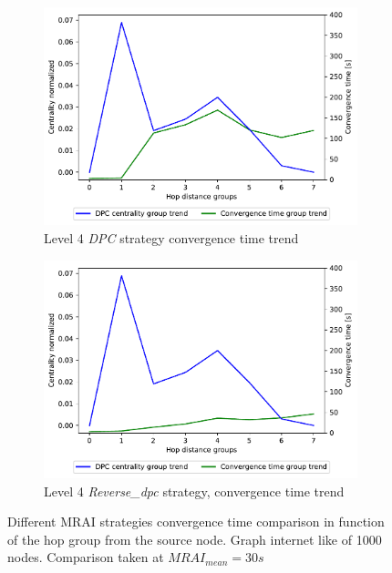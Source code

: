 \documentclass[10pt,conference,letterpaper]{IEEEtran}
\newcommand{\figwidth}{0.78}
\newcommand{\figvspace}{-1.5em}
\begin{document}
\begin{figure}[tb]
	\begin{subfigure}{.49\columnwidth}
		\centering
		\includegraphics[width=\figwidth\columnwidth]{images/different_levels/1000-DPC-l11_node-conv_MRAI30_centVStime_trend.pdf}
		\caption{Level 4 \textit{DPC} strategy convergence time trend}
		\label{fig:1000-dpc-time-trend-level4}
	\end{subfigure}
	\hfill
	\begin{subfigure}{.49\columnwidth}
		\centering
		\includegraphics[width=\figwidth\columnwidth]{images/different_levels/1000-reverse_dpc-l11_node-conv_MRAI30_centVStime_trend.pdf}
		\caption{Level 4 \textit{Reverse\_dpc} strategy, convergence time trend}
		\label{fig:1000-reverse-dpc-time-trend-level4}
	\end{subfigure}

	\caption{Different \ac{MRAI} strategies convergence time comparison 
			 in function of the hop group from the source node.
			 Graph internet like of \num{1000} nodes.
			 Comparison taken at $MRAI_{mean} = 30s$}
	\label{fig:1000-dpcVSreverse_time}
	\vspace{\figvspace}
\end{figure}
\end{document}
